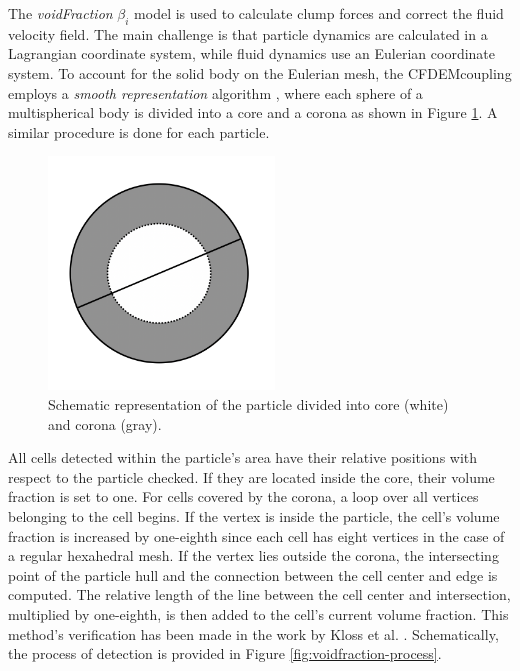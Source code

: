 The \textit{voidFraction} $\beta_i$ model is used to calculate clump forces and correct the fluid velocity field. The main challenge is that particle dynamics are calculated in a Lagrangian coordinate system, while fluid dynamics use an Eulerian coordinate system. To account for the solid body on the Eulerian mesh, the CFDEMcoupling employs a \textit{smooth representation} algorithm \cite{kloss2012models}, where each sphere of a multispherical body is divided into a core and a corona as shown in Figure \ref{fig:core}. A similar procedure is done for each particle.
\begin{figure}[ht]
    \centering
    \includegraphics[width=6cm]{Images/chap3/core_corona.png}
    \caption{Schematic representation of the particle divided into core (white) and corona (gray).}
    \label{fig:core}
\end{figure}
All cells detected within the particle's area have their relative positions with respect to the particle checked. If they are located inside the core, their volume fraction is set to one. For cells covered by the corona, a loop over all vertices belonging to the cell begins. If the vertex is inside the particle, the cell's volume fraction is increased by one-eighth since each cell has eight vertices in the case of a regular hexahedral mesh. If the vertex lies outside the corona, the intersecting point of the particle hull and the connection between the cell center and edge is computed. The relative length of the line between the cell center and intersection, multiplied by one-eighth, is then added to the cell's current volume fraction. This method's verification has been made in the work by Kloss et al. \cite{kloss2012models}. Schematically, the process of detection is provided in Figure \ref{fig:voidfraction-process}.

